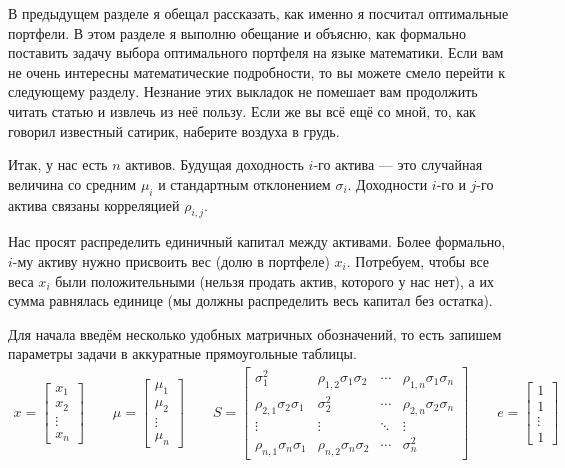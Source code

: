 В предыдущем разделе я обещал рассказать, как именно я посчитал оптимальные портфели. В этом разделе я выполню обещание и объясню, как формально поставить задачу выбора оптимального портфеля на языке математики. Если вам не очень интересны математические подробности, то вы можете смело перейти к следующему разделу. Незнание этих выкладок не помешает вам продолжить читать статью и извлечь из неё пользу. Если же вы всё ещё со мной, то, как говорил известный сатирик, наберите воздуха в грудь.

Итак, у нас есть $n$ активов. Будущая доходность $i$-го актива --- это случайная величина со средним $\mu_i$ и стандартным отклонением $\sigma_i$. Доходности $i$-го и $j$-го актива связаны корреляцией $\rho_{i,j}$.

Нас просят распределить единичный капитал между активами. Более формально, $i$-му активу нужно присвоить вес (долю в портфеле) $x_i$. Потребуем, чтобы все веса $x_i$ были положительными (нельзя продать актив, которого у нас нет), а их сумма равнялась единице (мы должны распределить весь капитал без остатка). 

Для начала введём несколько удобных матричных обозначений, то есть запишем параметры задачи в аккуратные прямоугольные таблицы.
\begin{align*}
x = \begin{bmatrix}x_1 \\ x_2 \\ \vdots \\ x_n\end{bmatrix}
\qquad
\mu = \begin{bmatrix}\mu_1 \\ \mu_2 \\ \vdots \\ \mu_n\end{bmatrix}
\qquad
S = \begin{bmatrix}
\sigma_1^2 & \rho_{1,2}\sigma_1\sigma_2 & \cdots & \rho_{1,n}\sigma_1\sigma_n \\
\rho_{2,1}\sigma_2\sigma_1 & \sigma_2^2 & \cdots & \rho_{2,n}\sigma_2\sigma_n \\
\vdots & \vdots & \ddots & \vdots \\
\rho_{n,1}\sigma_n\sigma_1 & \rho_{n,2}\sigma_n\sigma_2 & \cdots & \sigma_n^2
\end{bmatrix}
\qquad
e = \begin{bmatrix}1 \\ 1 \\ \vdots \\ 1\end{bmatrix}
\end{align*}

